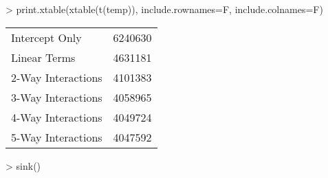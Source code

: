 
> print.xtable(xtable(t(temp)), include.rownames=F, include.colnames=F)
\begin{table}[ht]
\centering
\begin{tabular}{ll}
  \hline
  \hline
Intercept Only & 6240630 \\ 
  Linear Terms & 4631181 \\ 
  2-Way Interactions & 4101383 \\ 
  3-Way Interactions & 4058965 \\ 
  4-Way Interactions & 4049724 \\ 
  5-Way Interactions & 4047592 \\ 
   \hline
\end{tabular}
\end{table}

> sink()
